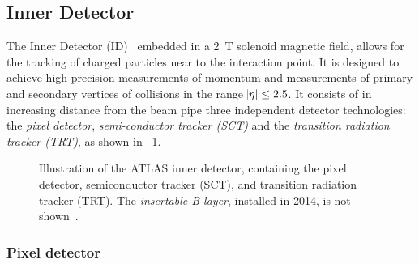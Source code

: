 \subsection{Inner Detector}\label{sec:method:ID}

The Inner Detector (ID)~\cite{ATLAS:ID-TDR} embedded in a \SI{2}{\tesla} solenoid magnetic field, allows for the tracking of charged particles near to the interaction point. It is designed to achieve high precision measurements of momentum and measurements of primary and secondary vertices of collisions in the range $\abs{\eta} \leq 2.5$. It consists of in increasing distance from the beam pipe three independent detector technologies: the \emph{pixel detector}, \emph{semi-conductor tracker (SCT)} and the \emph{transition radiation tracker (TRT)}, as shown in  ~\cref{fig:method:ATLAS:ID}. 

\begin{figure}
    \centering
    \caption[Illustration of the ATLAS inner detector]{Illustration of the ATLAS inner detector, containing the pixel detector, semiconductor tracker (SCT), and transition radiation tracker (TRT). The \emph{insertable B-layer}, installed in 2014, is not shown~\cite{ATLASIDImage}.}
    \label{fig:method:ATLAS:ID}
\end{figure}

\subsubsection{Pixel detector}

